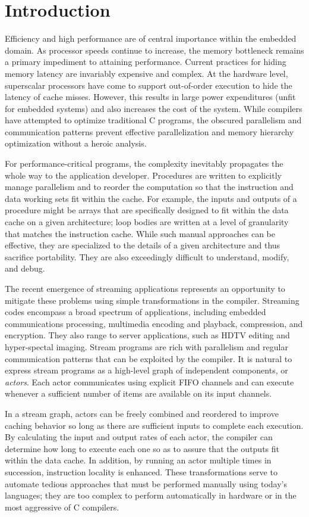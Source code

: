 \section{Introduction}

Efficiency and high performance are of central importance within the
embedded domain.  As processor speeds continue to increase, the memory
bottleneck remains a primary impediment to attaining performance.
Current practices for hiding memory latency are invariably expensive
and complex.  At the hardware level, superscalar processors have come
to support out-of-order execution to hide the latency of cache misses.
However, this results in large power expenditures (unfit for embedded
systems) and also increases the cost of the system.  While compilers
have attempted to optimize traditional C programs, the obscured
parallelism and communication patterns prevent effective
parallelization and memory hierarchy optimization without a heroic
analysis.

For performance-critical programs, the complexity inevitably
propagates the whole way to the application developer.  Procedures are
written to explicitly manage parallelism and to reorder the
computation so that the instruction and data working sets fit within
the cache.  For example, the inputs and outputs of a procedure might
be arrays that are specifically designed to fit within the data cache
on a given architecture; loop bodies are written at a level of
granularity that matches the instruction cache.  While such manual
approaches can be effective, they are specialized to the details of a
given architecture and thus sacrifice portability.  They are also
exceedingly difficult to understand, modify, and debug.

The recent emergence of streaming applications represents an
opportunity to mitigate these problems using simple transformations in
the compiler.  Streaming codes encompass a broad spectrum of
applications, including embedded communications processing, multimedia
encoding and playback, compression, and encryption.  They also range
to server applications, such as HDTV editing and hyper-spectal
imaging.  Stream programs are rich with parallelism and regular
communication patterns that can be exploited by the compiler.  It is
natural to express stream programs as a high-level graph of
independent components, or {\it actors}.  Each actor communicates
using explicit FIFO channels and can execute whenever a sufficient
number of items are available on its input channels.

In a stream graph, actors can be freely combined and reordered to
improve caching behavior so long as there are sufficient inputs to
complete each execution.  By calculating the input and output rates of
each actor, the compiler can determine how long to execute each one so
as to assure that the outputs fit within the data cache.  In addition,
by running an actor multiple times in succession, instruction locality
is enhanced.  These transformations serve to automate tedious
approaches that must be performed manually using today's languages;
they are too complex to perform automatically in hardware or in the
most aggressive of C compilers.

